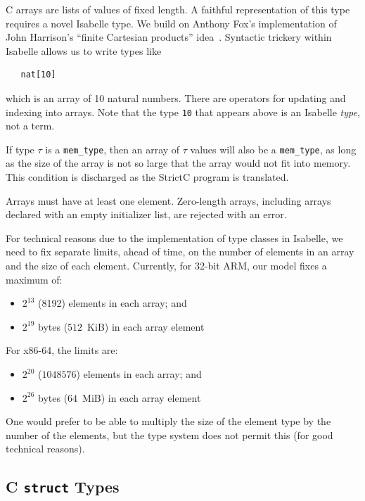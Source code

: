 \documentclass{article}
\newcommand{\strictc}{\textsf{StrictC}}
\begin{document}
C arrays are lists of values of fixed length.  A faithful
representation of this type requires a novel Isabelle type.  We build
on Anthony Fox's implementation of John Harrison's ``finite Cartesian
products'' idea~\cite{Harrison:TPHOLs2005:Euclidean-Space}.  Syntactic
trickery within Isabelle allows us to write types like
\begin{verbatim}
   nat[10]
\end{verbatim}
which is an array of 10 natural numbers.  There are operators for
updating and indexing into arrays.  Note that the type \texttt{10}
that appears above is an Isabelle \emph{type}, not a term.

If type $\tau$ is a \texttt{mem_type}, then an array of $\tau$ values
will also be a \texttt{mem_type}, as long as the size of the array is
not so large that the array would not fit into memory.  This condition
is discharged as the \strictc{} program is translated.

Arrays must have at least one element.  Zero-length arrays, including
arrays declared with an empty initializer list, are rejected with an
error.

For technical reasons due to the implementation of type classes in
Isabelle, we need to fix separate limits, ahead of time, on the
number of elements in an array and the size of each element.
Currently, for 32-bit ARM, our model fixes a maximum of:

\begin{itemize}
\item $2^{13}$ (8192) elements in each array; and
\item $2^{19}$ bytes ($512$~KiB) in each array element
\end{itemize}

For x86-64, the limits are:

\begin{itemize}
\item $2^{20}$ ($1048576$) elements in each array; and
\item $2^{26}$ bytes ($64$~MiB) in each array element
\end{itemize}

One would prefer to be able to multiply the size of the element type by
the number of the elements, but the type system does not permit this
(for good technical reasons).

\subsection{C \texttt{struct} Types}
\label{sec:structs}
\end{document}
